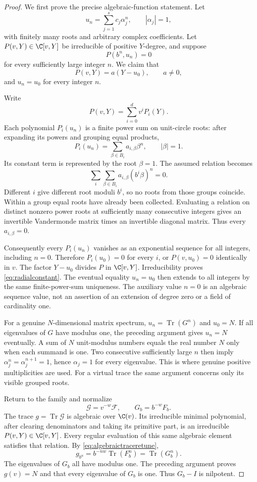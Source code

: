 \documentclass[11pt,a4paper]{article}
\theoremstyle{named}\newtheorem{finding}{Finding}[section]
\theoremstyle{definition}\newtheorem{definition}[finding]{Definition}
\theoremstyle{remark}\newtheorem{remark}[finding]{Remark}
\begin{document}
\begin{proof}
We first prove the precise algebraic-function statement.
Let
\[
 u_n=\sum_{j=1}^s c_j\alpha_j^n,\qquad |\alpha_j|=1,
\]
with finitely many roots and arbitrary complex coefficients.
Let $P(v,Y)\in\C[v,Y]$ be irreducible of positive
$Y$-degree, and suppose
\[
 P(b^n,u_n)=0
\]
for every sufficiently large integer $n$.
We claim that
\begin{equation}\label{eq:radialconstant}
 P(v,Y)=a(Y-u_0),\qquad a\ne0,
\end{equation}
and $u_n=u_0$ for every integer $n$.

Write
\[
 P(v,Y)=\sum_{i=0}^d v^iP_i(Y).
\]
Each polynomial $P_i(u_n)$ is a finite power sum on
unit-circle roots: after expanding its powers and grouping
equal products,
\[
 P_i(u_n)=\sum_{\beta\in B_i} a_{i,\beta}\beta^n,
 \qquad |\beta|=1.
\]
Its constant term is represented by the root $\beta=1$.
The assumed relation becomes
\[
 \sum_i\sum_{\beta\in B_i}
       a_{i,\beta}(b^i\beta)^n=0.
\]
Different $i$ give different root moduli $b^i$, so no
roots from those groups coincide.
Within a group equal roots have already been collected.
Evaluating a relation on distinct nonzero power roots
at sufficiently many consecutive integers gives an
invertible Vandermonde matrix times an invertible
diagonal matrix. Thus every $a_{i,\beta}=0$.

Consequently every $P_i(u_n)$ vanishes as an exponential
sequence for all integers, including $n=0$.
Therefore $P_i(u_0)=0$ for every $i$, or
$P(v,u_0)=0$ identically in $v$.
The factor $Y-u_0$ divides $P$ in $\C[v,Y]$.
Irreducibility proves \eqref{eq:radialconstant}.
The eventual equality $u_n=u_0$ then extends to all
integers by the same finite-power-sum uniqueness.
The auxiliary value $n=0$ is an algebraic sequence value,
not an assertion of an extension of degree zero or a
field of cardinality one.

For a genuine $N$-dimensional matrix spectrum,
$u_n=\operatorname{Tr}(G^n)$ and $u_0=N$.
If all eigenvalues of $G$ have modulus one, the preceding
argument gives $u_n=N$ eventually.
A sum of $N$ unit-modulus numbers equals the real number
$N$ only when each summand is one.
Two consecutive sufficiently large $n$ then imply
$\alpha_j^n=\alpha_j^{n+1}=1$, hence $\alpha_j=1$
for every eigenvalue.
This is where genuine positive multiplicities are used.
For a virtual trace the same argument concerns only
its visible grouped roots.

Return to the family and normalize
\[
 \mathcal G=v^{-w}\mathcal F,\qquad G_b=b^{-w}F_b.
\]
The trace $g=\operatorname{Tr}\mathcal G$ is algebraic
over $\C(v)$. Its irreducible minimal polynomial,
after clearing denominators and taking its primitive
part, is an irreducible $P(v,Y)\in\C[v,Y]$.
Every regular evaluation of this same algebraic element
satisfies that relation.
By \eqref{eq:algebraictraceretune},
\[
 g_{b^n}
 =b^{-nw}\operatorname{Tr}(F_b^n)
 =\operatorname{Tr}(G_b^n).
\]
The eigenvalues of $G_b$ all have modulus one.
The preceding argument proves $g(v)=N$ and that every
eigenvalue of $G_b$ is one. Thus $G_b-I$ is nilpotent.


\end{proof}
\end{document}
